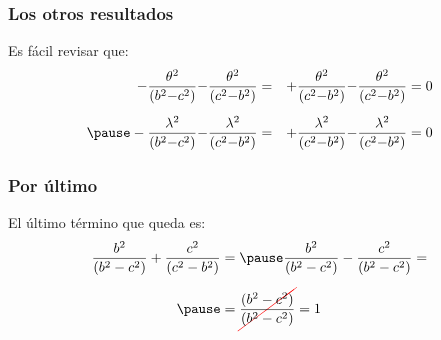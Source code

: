 \documentclass[12pt]{beamer}
\begin{document}
\begin{frame}
\frametitle{Los otros resultados}
Es fácil revisar que:
\pause
\begin{eqnarray*}
- \dfrac{\theta^{2}}{(b^{2} {-} c^{2})} {-} \dfrac{\theta^{2}}{(c^{2} {-} b^{2})} &=& + \dfrac{\theta^{2}}{(c^{2} {-} b^{2})} {-} \dfrac{\theta^{2}}{(c^{2} {-} b^{2})} = 0 \\[0.5em] \pause
- \dfrac{\lambda^{2}}{(b^{2} {-} c^{2})} {-} \dfrac{\lambda^{2}}{(c^{2} {-} b^{2})} &=& + \dfrac{\lambda^{2}}{(c^{2} {-} b^{2})} {-} \dfrac{\lambda^{2}}{(c^{2} {-} b^{2})} = 0
\end{eqnarray*}
\end{frame}
\begin{frame}
\frametitle{Por último}
El último término que queda es:
\pause
\begin{eqnarray*}
\begin{aligned}
\dfrac{b^{2}}{(b^{2} - c^{2})} + \dfrac{c^{2}}{(c^{2} - b^{2})} &= \pause \dfrac{b^{2}}{(b^{2} - c^{2})} - \dfrac{c^{2}}{(b^{2} - c^{2})} = \\[0.5em] \pause
&= \Cancel[red]{\dfrac{(b^{2} - c^{2})}{(b^{2} - c^{2})}} = 1
\end{aligned}
\end{eqnarray*}
\end{frame}  
\end{document}
